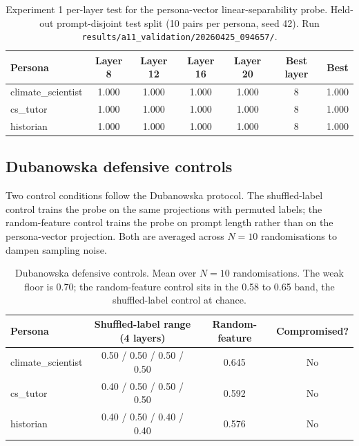 \begin{table}[H]
  \centering
  \small
  \caption{Experiment 1 per-layer test \auroc{} for the persona-vector linear-separability probe. Held-out prompt-disjoint test split (10 pairs per persona, seed 42). Run \texttt{results/a11\_validation/20260425\_094657/}.}
  \label{tab:experiment-1-auroc}
  \begin{tabular}{lcccccc}
    \toprule
    \textbf{Persona} & \textbf{Layer 8} & \textbf{Layer 12} & \textbf{Layer 16} & \textbf{Layer 20} & \textbf{Best layer} & \textbf{Best \auroc{}} \\
    \midrule
    climate\_scientist & 1.000 & 1.000 & 1.000 & 1.000 & 8 & 1.000 \\
    cs\_tutor          & 1.000 & 1.000 & 1.000 & 1.000 & 8 & 1.000 \\
    historian          & 1.000 & 1.000 & 1.000 & 1.000 & 8 & 1.000 \\
    \bottomrule
  \end{tabular}
\end{table}

\subsection{Dubanowska defensive controls}

Two control conditions follow the Dubanowska protocol\autocite{dubanowska2025}. The shuffled-label control trains the probe on the same projections with permuted labels; the random-feature control trains the probe on prompt length rather than on the persona-vector projection. Both are averaged across $N = 10$ randomisations to dampen sampling noise.

\begin{table}[H]
  \centering
  \small
  \caption{Dubanowska defensive controls. Mean over $N = 10$ randomisations. The weak floor is 0.70; the random-feature control sits in the 0.58 to 0.65 band, the shuffled-label control at chance.}
  \label{tab:dubanowska}
  \begin{tabular}{lccc}
    \toprule
    \textbf{Persona} & \textbf{Shuffled-label range (4 layers)} & \textbf{Random-feature} & \textbf{Compromised?} \\
    \midrule
    climate\_scientist & 0.50 / 0.50 / 0.50 / 0.50 & 0.645 & No \\
    cs\_tutor          & 0.40 / 0.50 / 0.50 / 0.50 & 0.592 & No \\
    historian          & 0.40 / 0.50 / 0.40 / 0.40 & 0.576 & No \\
    \bottomrule
  \end{tabular}
\end{table}

